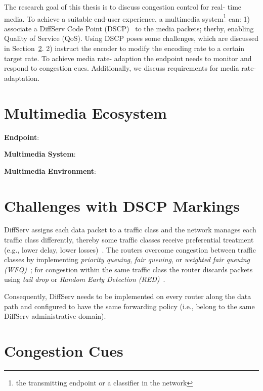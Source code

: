 
The research goal of this thesis is to discuss congestion control for real-
time media. To achieve a suitable end-user experience, a multimedia
system\footnote{the transmitting endpoint or a classifier in the network} can:
1) associate a DiffServ Code Point (DSCP)~\cite{rfc2474} to the media packets;
therby, enabling Quality of Service (QoS). Using DSCP poses some challenges,
which are discussed in Section~\ref{rg.ch.dscp}. 2) instruct the encoder to
modify the encoding rate to a certain target rate. To achieve media rate-
adaption the endpoint needs to monitor and respond to congestion cues.
Additionally, we  discuss requirements for media rate-adaptation.


\section{Multimedia Ecosystem}

\textbf{Endpoint}:

\textbf{Multimedia System}:

\textbf{Multimedia Environment}:

\section{Challenges with DSCP Markings}
\label{rg.ch.dscp}

DiffServ assigns each data packet to a traffic class and the network manages
each traffic class differently, thereby some traffic classes receive
preferential treatment (e.g., lower delay, lower losses)~\cite{rfc2475}. The
routers overcome congestion between traffic classes by implementing
\emph{priority queuing}, \emph{fair queuing}, or \emph{weighted fair queuing
(WFQ)}~\cite{rfc5865}; for congestion within the same traffic class the
router discards packets using \emph{tail drop} or \emph{Random Early Detection
(RED)}~\cite{Floyd:RED}.

Consequently, DiffServ needs to be implemented on every router along the data
path and configured to have the same forwarding policy (i.e., belong to the
same DiffServ administrative domain). 


\section{Congestion Cues}
